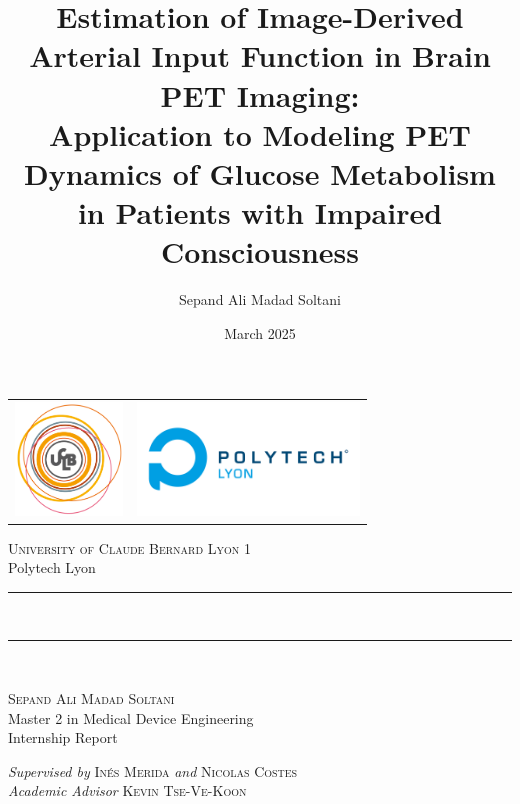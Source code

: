 \documentclass[a4paper,12pt,twoside,english,openany]{book}
\title{Estimation of Image-Derived Arterial Input Function in Brain PET Imaging: \\ Application to Modeling PET Dynamics of Glucose Metabolism in Patients with Impaired Consciousness}
\author{Sepand Ali Madad Soltani}
\date{March 2025}
\begin{document}
\begin{titlepage}
	\begin{center}
		\begin{tabular}{c@{\hskip 7cm}c@{\hskip 1cm}}
			\includegraphics[height=3cm]{res/ucbl.png} &
			\includegraphics[height=3cm]{res/polytech2.png}
		\end{tabular}
	\end{center}

	\begin{center}

		\vspace*{.03\textheight}
		\textsc{\Large University of Claude Bernard Lyon 1}\\[0.2cm]
		\large Polytech Lyon

		\rule{\textwidth}{0.8pt} \\
		\vspace{10pt}

		{\huge \bfseries \thetitle}
		\rule{\textwidth}{0.8pt} \\

		\vfill

		\vspace{18mm}

		{\Large \textsc{Sepand Ali Madad Soltani}}\\[3mm]
		{\large Master 2 in Medical Device Engineering}\\[1mm]
		{\large Internship Report}

		\vspace{12mm}

		{\normalsize \textit{Supervised by} \textsc{Inés Merida} \textit{and} \textsc{Nicolas Costes}}\\[2mm]
		{\normalsize \textit{Academic Advisor} \textsc{Kevin Tse-Ve-Koon}}

		\vspace{10mm}


\end{center}
\end{titlepage}
\end{document}
